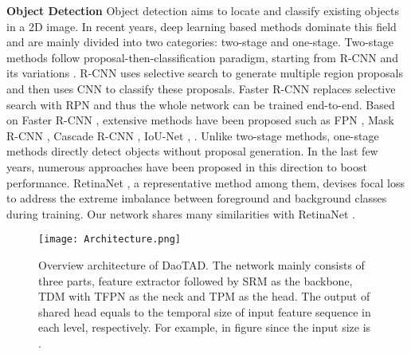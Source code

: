 \documentclass[final]{cvpr}
\begin{document}
\textbf{Object Detection}
Object detection aims to locate and classify existing objects in a 2D image. In recent years, deep learning based methods dominate this field and are mainly divided into two categories: two-stage and one-stage. Two-stage methods follow  proposal-then-classification paradigm, starting from R-CNN \cite{girshick2014rich} and its variations \cite{girshick2015fast, ren2016faster}. R-CNN \cite{girshick2014rich} uses selective search \cite{uijlings2013selective} to generate multiple region proposals and then uses CNN to classify these proposals. Faster R-CNN \cite{ren2016faster} replaces selective search with RPN and thus the whole network can be trained end-to-end. Based on Faster R-CNN \cite{ren2016faster}, extensive methods have been proposed such as FPN \cite{lin2017feature}, Mask R-CNN \cite{he2017mask}, Cascade R-CNN \cite{cai2018cascade}, IoU-Net \cite{jiang2018acquisition}, \etc. Unlike two-stage methods, one-stage methods directly detect objects without proposal generation. In the last few years, numerous approaches \cite{redmon2016you, redmon2017yolo9000, redmon2018yolov3, liu2016ssd, lin2017focal, tian2019fcos, wu2019iou, li2020generalized, wu2020iou, zheng2020distance} have been proposed in this direction to boost performance. RetinaNet \cite{lin2017focal}, a representative method among them, devises focal loss to address the extreme imbalance between foreground and background classes during training. Our network shares many similarities with RetinaNet \cite{lin2017focal}.

\begin{figure*}[htp]
    \centering
    \texttt{[image: Architecture.png]}
    \caption{Overview architecture of DaoTAD. The network mainly consists of three parts, feature extractor followed by SRM as the backbone, TDM with TFPN as the neck and TPM as the head. The output  of shared head equals to the temporal size of input feature sequence in each level, respectively. For example,  in figure since the input size is .}
    \label{network structure}
\end{figure*}
\end{document}
